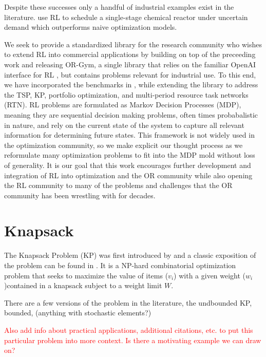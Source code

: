 \documentclass[12pt]{article}
\begin{document}
Despite these successes only a handful of industrial examples exist in the literature. 
\citet{Hubbs2020} use RL to schedule a single-stage chemical reactor under uncertain demand which outperforms naive optimization models. 

We seek to provide a standardized library for the research community who wishes to extend RL into commercial applications by building on top of the preceeding work and releasing OR-Gym, a single library that relies on the familiar OpenAI interface for RL \citep{Brockman2016}, but contains problems relevant for industrial use.
To this end, we have incorporated the benchmarks in \citet{Balaji2019}, while extending the library to address the TSP, KP, portfolio optimization, and multi-period resource task networks (RTN). 
RL problems are formulated as Markov Decision Processes (MDP), meaning they are sequential decision making problems, often times probabalistic in nature, and rely on the current state of the system to capture all relevant information for determining future states. %
This framework is not widely used in the optimization community, so we make explicit our thought process as we reformulate many optimization problems to fit into the MDP mold without loss of generality.
It is our goal that this work encourages further development and integration of RL into optimization and the OR community while also opening the RL community to many of the problems and challenges that the OR community has been wrestling with for decades.

\section{Knapsack}

The Knapsack Problem (KP) was first introduced by \citet{Mathews1896} and a classic exposition of the problem can be found in \citet{Dantzig1957}.
It is a NP-hard combinatorial optimization problem that seeks to maximize the value of items ($v_i$) with a given weight ($w_i$)contained in a knapsack subject to a weight limit $W$. 

There are a few versions of the problem in the literature, the undbounded KP, bounded, (anything with stochastic elements?)

\textcolor{red}{Also add info about practical applications, additional citations, etc. to put this particular problem into more context. Is there a motivating example we can draw on?}
\end{document}

